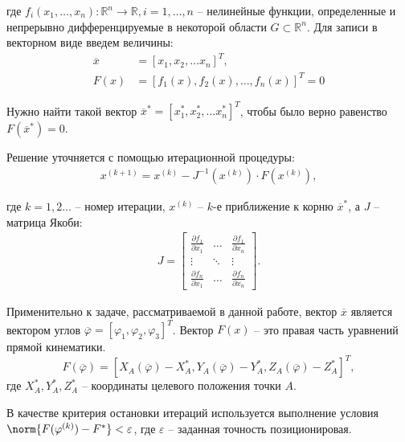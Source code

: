 \noindent где $ f_i(x_1,\dots,x_n): \mathbb{R}^n \rightarrow \mathbb{R}, i=1,\dots, n $ -- нелинейные функции, определенные и непрерывно дифференцируемые в некоторой области $ G \subset \mathbb{R}^n $. Для записи в векторном виде введем величины:
\begin{align*}
    \overline{x} &= [x_1, x_2, \dots x_n]^T, \\
    F(x) &= [f_1(x), f_2(x),\dots,f_n(x)]^T = 0
\end{align*}

Нужно найти такой вектор $ \overline{x}^*=[x_1^*, x_2^*, \dots x_n^*]^T $, чтобы было верно равенство $ F(\overline{x}^*) = 0 $. 

Решение уточняется с помощью итерационной процедуры:
\begin{align*} %
    x^{(k+1)}=x^{(k)}-J^{-1}(x^{(k)}) \cdot F(x^{(k)}),
\end{align*} %

\noindent где $ k=1,2\dots $ -- номер итерации, $ x^{(k)} $ -- $k$-е приближение к корню $ \overline{x}^* $, а $ J $ -- матрица Якоби:
\begin{align*}
    J = \begin{bmatrix}
        \frac{\partial f_1}{\partial x_1} & \dots & \frac{\partial f_1}{\partial x_n} \\
        \vdots & \ddots & \vdots \\
        \frac{\partial f_n}{\partial x_1} & \dots & \frac{\partial f_n}{\partial x_n}
    \end{bmatrix}.
\end{align*}

Применительно к задаче, рассматриваемой в данной работе, вектор $ \overline{x} $ является  вектором углов $ \overline{\varphi} = [ \varphi_1, \varphi_2, \varphi_3 ]^T $. Вектор $ F(x) $ -- это правая часть уравнений прямой кинематики.
\begin{equation*}
    F(\overline{\varphi}) = [ X_A(\overline{\varphi}) - X_A^*, Y_A(\overline{\varphi}) - Y_A^*, Z_A(\overline{\varphi}) - Z_A^* ]^T,
\end{equation*}
где $ X_A^*, Y_A^*, Z_A^* $ -- координаты целевого положения точки $A$.

В качестве критерия остановки итераций используется выполнение условия $ \norm{F(\varphi^{(k)}) - F^* } < \varepsilon $, где $\varepsilon $ -- заданная точность позиционировая.

